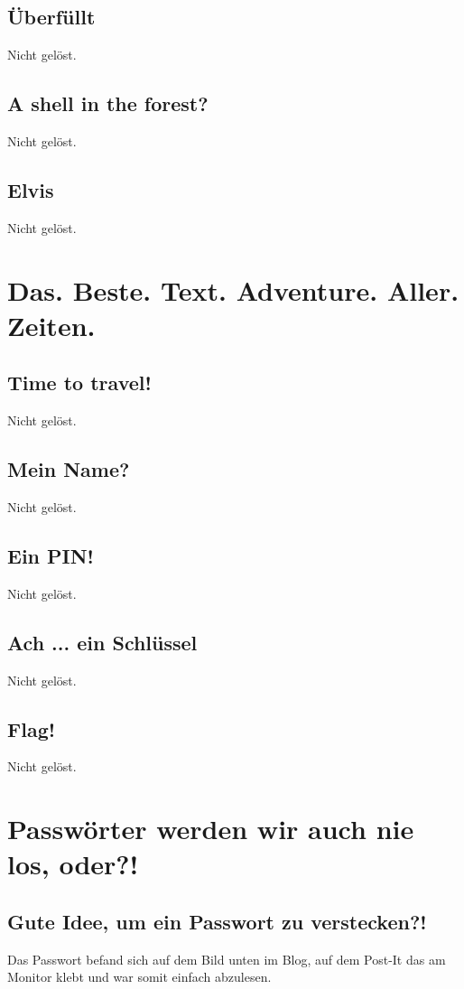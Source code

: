 \documentclass[12pt, a4paper, titlepage, oneside]{scrartcl}
\begin{document}
	\subsection{\"Uberf\"ullt}
	Nicht gelöst.

	\subsection{A shell in the forest?}
	Nicht gelöst.

	\subsection{Elvis}
	Nicht gelöst.

	\section{Das. Beste. Text. Adventure. Aller. Zeiten.}

	\subsection{Time to travel!}
	Nicht gelöst.

	\subsection{Mein Name?}
	Nicht gelöst.

	\subsection{Ein PIN!}
	Nicht gelöst.

	\subsection{Ach ... ein Schl\"ussel}
	Nicht gelöst.

	\subsection{Flag!}
	Nicht gelöst.

	\section{Passwörter werden wir auch nie los, oder?!}

	\subsection{Gute Idee, um ein Passwort zu verstecken?!}
	Das Passwort befand sich auf dem Bild unten im Blog, auf dem Post-It das am Monitor klebt und war somit einfach abzulesen.
\end{document}
